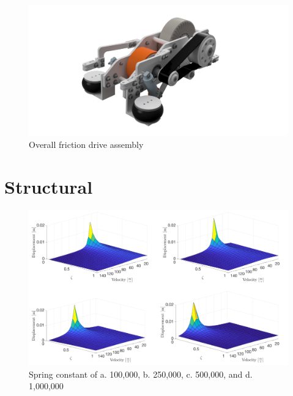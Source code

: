 \documentclass[main.tex]{subfiles}
\begin{document}
  \begin{figure}[H]
\includegraphics[width=\textwidth]{images/friction_rear.png}
\caption{Overall friction drive assembly}\label{fig:friction_rear}
\end{figure}

    \section{Structural}
    \begin{figure}
        \centering
        \includegraphics[width=\textwidth]{images/fig1}
        \caption{Spring constant of a. 100,000, b. 250,000, c. 500,000, and d. 1,000,000}
        \label{fig:spring1}
    \end{figure}
\end{document}

